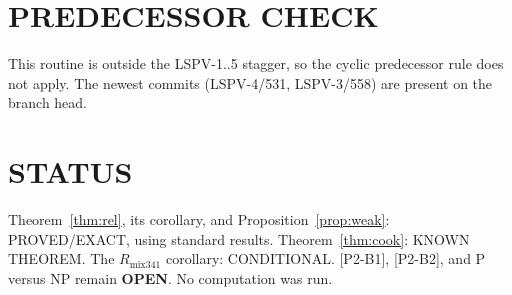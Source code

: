 \documentclass[11pt]{article}
\theoremstyle{definition}
\theoremstyle{remark}
\begin{document}
\section*{PREDECESSOR CHECK}
This routine is outside the LSPV-1..5 stagger, so the cyclic predecessor rule does not apply.
The newest commits (LSPV-4/531, LSPV-3/558) are present on the branch head.

\section*{STATUS}
Theorem~\ref{thm:rel}, its corollary, and Proposition~\ref{prop:weak}: PROVED/EXACT, using
standard results. Theorem~\ref{thm:cook}: KNOWN THEOREM. The $R_{\mathrm{mix341}}$ corollary:
CONDITIONAL. [P2-B1], [P2-B2], and P versus NP remain \textbf{OPEN}. No computation was run.
\end{document}
